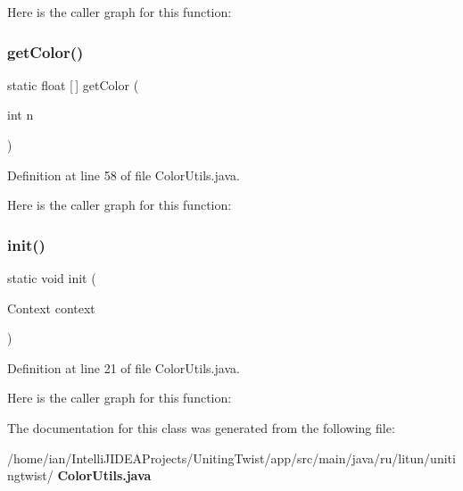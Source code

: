 Here is the caller graph for this function\+:
\mbox{\label{classru_1_1litun_1_1unitingtwist_1_1_color_utils_aa3a7d7ee785a482b0ff389374266933a}} 
\subsubsection{get\+Color()}
{\footnotesize\ttfamily static float [$\,$] get\+Color (\begin{DoxyParamCaption}\item[{int}]{n }\end{DoxyParamCaption})\hspace{0.3cm}{\ttfamily [static]}}



Definition at line 58 of file Color\+Utils.\+java.

Here is the caller graph for this function\+:
\mbox{\label{classru_1_1litun_1_1unitingtwist_1_1_color_utils_ad564b38011fb56e37ce0ae341781184d}} 
\subsubsection{init()}
{\footnotesize\ttfamily static void init (\begin{DoxyParamCaption}\item[{Context}]{context }\end{DoxyParamCaption})\hspace{0.3cm}{\ttfamily [static]}}



Definition at line 21 of file Color\+Utils.\+java.

Here is the caller graph for this function\+:


The documentation for this class was generated from the following file\+:\begin{DoxyCompactItemize}
\item 
/home/ian/\+Intelli\+J\+I\+D\+E\+A\+Projects/\+Uniting\+Twist/app/src/main/java/ru/litun/unitingtwist/\textbf{ Color\+Utils.\+java}\end{DoxyCompactItemize}
